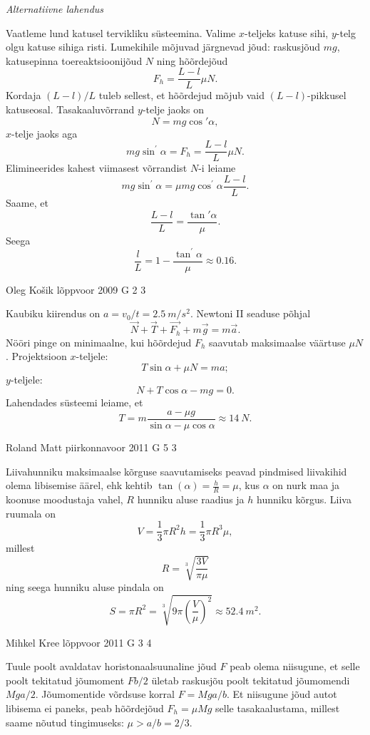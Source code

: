 \documentclass[11pt, twoside]{article}
\begin{document}
{{\vspace{0.5\baselineskip}

\emph{Alternatiivne lahendus}

Vaatleme lund katusel tervikliku süsteemina. Valime $x$-teljeks katuse sihi, $y$-telg olgu katuse sihiga risti. Lumekihile mõjuvad järgnevad jõud: raskusjõud $mg$, katusepinna toereaktsioonijõud $N$ ning hõõrdejõud
\[
F_h = \frac{L-l}{L} \mu N.
\]
Kordaja $(L-l)/L$ tuleb sellest, et hõõrdejud mõjub vaid $(L-l)$-pikkusel katuseosal.
Tasakaaluvõrrand $y$-telje jaoks on
\[
N = mg \cos ' \alpha,
\]
$x$-telje jaoks aga
\[
m g \sin ^{\prime} \alpha=F_{h}=\frac{L-l}{L} \mu N.
\]
Elimineerides kahest viimasest võrrandist $N$-i leiame
\[
m g \sin ^{\prime} \alpha=\mu m g \cos ^{\prime} \alpha \frac{L-l}{L}.
\]
Saame, et
\[
\frac{L-l}{L} = \frac{\tan'\alpha}{\mu}.
\]
Seega
\[
\frac{l}{L}=1-\frac{\tan ^{\prime} \alpha}{\mu} \approx \num{0,16}.
\]
\fi
}

{Oleg Košik} %
{lõppvoor} %
{2009} %
{G 2} %
{3} %
{

\ifSolution
Kaubiku kiirendus on $a=v_0/t=\SI{2.5}{m/s^2}$. Newtoni II seaduse põhjal
\[
\vec{N}+\vec{T}+\vec{F_h}+m\vec{g}=m\vec{a}.
\]
Nööri pinge on minimaalne, kui hõõrdejud $F_h$ saavutab maksimaalse väärtuse $\mu N$. Projektsioon $x$-teljele:
\[
T\sin\alpha+\mu N=ma;
\]
$y$-teljele:
\[
N+T\cos\alpha-mg=0.
\]
Lahendades süsteemi leiame, et
\[
T=m\frac{a-\mu g}{\sin\alpha-\mu\cos\alpha} \approx \SI{14}{N}.
\]
\fi
}

{Roland Matt} %
{piirkonnavoor} %
{2011} %
{G 5} %
{3} %
{

\ifSolution
Liivahunniku maksimaalse kõrguse saavutamiseks peavad pindmised liivakihid olema libisemise äärel, ehk kehtib $\tan (\alpha)=\frac{h}{R}=\mu$, kus $\alpha$ on nurk maa ja koonuse moodustaja vahel, $R$ hunniku aluse raadius ja $h$ hunniku kõrgus. Liiva ruumala on
\[
V=\frac{1}{3} \pi R^{2} h=\frac{1}{3} \pi R^{3} \mu,
\]
millest 
\[
R=\sqrt[3]{\frac{3 V}{\pi \mu}}
\]
ning seega hunniku aluse pindala on
\[
S=\pi R^{2}=\sqrt[3]{9 \pi\left(\frac{V}{\mu}\right)^{2}} \approx \SI{52.4}{m^2}.
\]
\fi
}

{Mihkel Kree} %
{lõppvoor} %
{2011} %
{G 3} %
{4} %
{

\ifSolution
Tuule poolt avaldatav horistonaalsuunaline jõud $F$ peab olema niisugune, et selle poolt tekitatud jõumoment $Fb/2$ ületab raskusjõu poolt tekitatud jõumomendi $Mga/2$. Jõumomentide võrdsuse korral $F=Mga/b$. Et niisugune jõud autot libisema ei paneks, peab hõõrdejõud $F_h=\mu Mg$ selle tasakaalustama, millest saame nõutud tingimuseks: $\mu > a/b = 2/3$.
\fi
}

}
\end{document}
